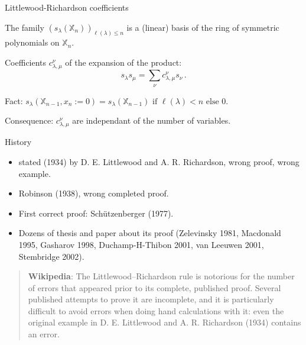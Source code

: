 \documentclass[compress,11pt]{beamer}
\newcommand{\XX}{{\mathbb X}}
\begin{document}
\begin{frame}{Littlewood-Richardson coefficients}

  \begin{PROP}
    The family $(s_\lambda(\XX_n))_{\ell(\lambda) \leq n}$ is a (linear) basis of the
    ring of symmetric polynomials on $\XX_n$.
  \end{PROP}

  \begin{DEFN}
    Coefficients $c_{\lambda,\mu}^\nu$ of the expansion of the product:
    \[
    s_\lambda s_\mu = \sum_{\nu} c_{\lambda,\mu}^\nu s_\nu\,.
    \]
  \end{DEFN}
  Fact: $s_\lambda(\XX_{n-1}, x_n := 0) =
  s_\lambda(\XX_{n-1}) \text{ if } \ell(\lambda) < n\text{ else } 0$.

  Consequence: $c_{\lambda,\mu}^\nu$ are independant of the number of variables.
\end{frame}

\begin{frame}{History}
  \begin{itemize}
  \item stated (1934) by D. E. Littlewood and A. R. Richardson, wrong proof,
    wrong example.
  \item Robinson (1938), wrong completed proof.
  \item First correct proof: Schützenberger (1977).
  \item Dozens of thesis and paper about its proof (Zelevinsky 1981, Macdonald
    1995, Gasharov 1998, Duchamp-H-Thibon 2001, van Leeuwen 2001, Stembridge
    2002).
  \end{itemize}

  \begin{quotation}\small
    \textbf{Wikipedia}: The Littlewood–Richardson rule is notorious for the
    number of errors that appeared prior to its complete, published
    proof. Several published attempts to prove it are incomplete, and it is
    particularly difficult to avoid errors when doing hand calculations with
    it: even the original example in D. E. Littlewood and A. R. Richardson
    (1934) contains an error.
 \end{quotation}
\end{frame}
\end{document}
